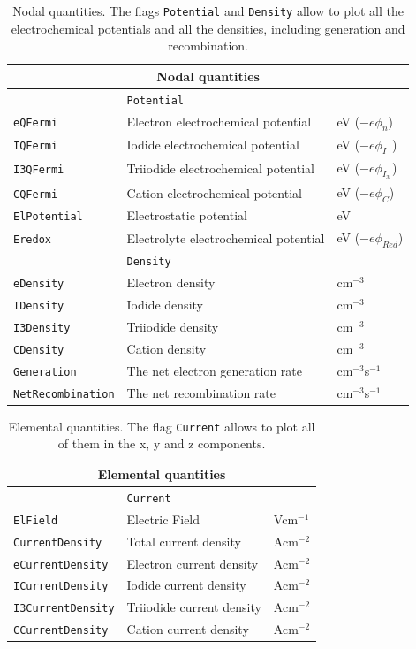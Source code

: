 \begin{table}[!htb]
\center
\begin{tabular}{l|p{8cm}|l}
\multicolumn{3}{c}{\textbf{Nodal quantities}} \\
\hline
 & \texttt{Potential} & \\
\hline
\texttt{eQFermi} & Electron electrochemical potential & eV ($-e\phi_n$)\\
\texttt{IQFermi} & Iodide electrochemical potential & eV ($-e\phi_{I^{-}}$)\\
\texttt{I3QFermi} & Triiodide electrochemical potential & eV ($-e\phi_{I^{-}_{3}}$)\\
\texttt{CQFermi} & Cation electrochemical potential & eV ($-e\phi_C$)\\
\texttt{ElPotential} & Electrostatic potential & eV \\
\texttt{Eredox} & Electrolyte electrochemical potential & eV ($-e\phi_{Red}$) \\
\hline
 & \texttt{Density} & \\
\hline
\texttt{eDensity} & Electron density & cm$^{-3}$ \\
\texttt{IDensity} & Iodide density & cm$^{-3}$ \\
\texttt{I3Density} & Triiodide density & cm$^{-3}$ \\
\texttt{CDensity} & Cation density & cm$^{-3}$ \\
\texttt{Generation} & The net electron generation rate & cm$^{-3}$s$^{-1}$ \\
\texttt{NetRecombination} & The net recombination rate & cm$^{-3}$s$^{-1}$ \\
\end{tabular}
\caption{Nodal quantities. The flags \texttt{Potential} and
\texttt{Density} allow to plot all the electrochemical potentials
and all the densities, including generation and recombination.}
\label{table:dsc_nodal}
\end{table}

\begin{table}[!htb]
\center
\begin{tabular}{l|p{5cm}|l}
\multicolumn{3}{c}{\textbf{Elemental quantities}} \\
\hline
 & \texttt{Current} & \\
\hline
\texttt{ElField} & Electric Field & Vcm$^{-1}$ \\
\texttt{CurrentDensity} & Total current density & Acm$^{-2}$ \\
\texttt{eCurrentDensity} & Electron current density & Acm$^{-2}$ \\
\texttt{ICurrentDensity} & Iodide current density & Acm$^{-2}$ \\
\texttt{I3CurrentDensity} & Triiodide current density & Acm$^{-2}$ \\
\texttt{CCurrentDensity} & Cation current density & Acm$^{-2}$ \\
\end{tabular}
\caption{Elemental quantities. The flag \texttt{Current} allows to
plot all of them in the x, y and z components.}
\label{table:dsc_elemental}
\end{table}

